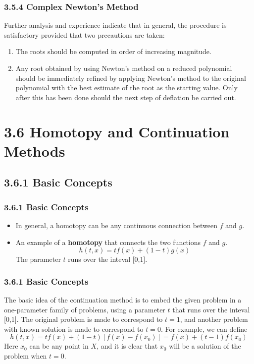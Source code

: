 \documentclass[notheorems,mathserif,table,compress]{beamer}  %
\begin{document}
\begin{frame}
  \frametitle{3.5.4 Complex Newton's Method}
  Further analysis and experience indicate that in general, the procedure is satisfactory provided that two precautions are taken:
  \begin{enumerate}
  \item The roots should be computed in order of increasing magnitude.
  \item Any root obtained by using Newton's method on a reduced polynomial should be immediately refined by applying Newton's method to the original polynomial with the best estimate of the root as the starting value. Only after this has been done should the next step of deflation be carried out.
  \end{enumerate}
\end{frame}


\section{3.6 Homotopy and Continuation Methods}

\subsection{3.6.1 Basic Concepts}


\begin{frame}
  \frametitle{3.6.1 Basic Concepts}
  \begin{itemize}
  \item In general, a homotopy can be any continuous connection between $f$ and $g$.
  \item An example of a \textbf{homotopy} that connects the two functions $f$ and $g$. 
  \[ h(t,x)=tf(x)+(1-t)g(x) \]
  The parameter $t$ runs over the inteval [0,1].
  \end{itemize}
\end{frame}


\begin{frame}
  \frametitle{3.6.1 Basic Concepts}
  The basic idea of the continuation method is to embed the given problem in a one-parameter family of problems, using a parameter $t$ that   runs over the inteval [0,1]. The original problem is made to correspond to $t=1$, and another problem with known solution is made to correspond to $t=0$. For example, we can define
  \[ h(t,x)=tf(x)+(1-t)[f(x)-f(x_0)]=f(x)+(t-1)f(x_0) \] 
  Here $x_0$ can be any point in $X$, and it is clear that $x_0$ will be a solution of the problem when $t=0$.
\end{frame}
\end{document}
